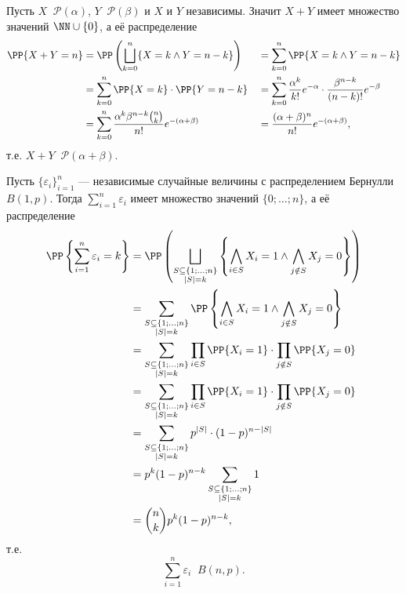 \documentclass[12pt,a4paper]{article}
\newcommand{\Deq}{\mathop{\stackrel{\mathcal{D}}{=}}}
\begin{document}
    \begin{example}
        Пусть $X \Deq \mathcal{P}(\alpha)$, $Y \Deq \mathcal{P}(\beta)$ и $X$ и $Y$ независимы. Значит $X + Y$ имеет множество значений $\NN \cup \{0\}$, а её распределение
        \begin{align*}
            \PP\{X + Y = n\}
            &= \PP\left(\bigsqcup_{k=0}^n \{X = k \wedge Y = n-k\}\right)&
            &= \sum_{k=0}^n \PP\{X = k \wedge Y = n-k\}\\
            &= \sum_{k=0}^n \PP\{X = k\} \cdot \PP\{Y = n-k\}&
            &= \sum_{k=0}^n \frac{\alpha^k}{k!} e^{-\alpha} \cdot \frac{\beta^{n-k}}{(n-k)!} e^{-\beta}\\
            &= \sum_{k=0}^n \frac{\alpha^k \beta^{n-k} \binom{n}{k}}{n!} e^{-(\alpha + \beta)}&
            &= \frac{(\alpha + \beta)^n}{n!} e^{-(\alpha + \beta)},
        \end{align*}
        т.е. $X + Y \Deq \mathcal{P}(\alpha + \beta)$.
    \end{example}

    \begin{example}
        Пусть $\{\varepsilon_i\}_{i=1}^n$ --- независимые случайные величины с распределением Бернулли $B(1, p)$. Тогда $\sum_{i=1}^n \varepsilon_i$ имеет множество значений $\{0; \dots; n\}$, а её распределение
        \begin{align*}
            \PP\left\{\sum_{i=1}^n \varepsilon_i = k\right\}
            &= \PP\left(\bigsqcup_{\substack{S \subseteq \{1; \dots; n\}\\ |S| = k}} \left\{\bigwedge_{i \in S} X_i = 1 \wedge \bigwedge_{j \notin S} X_j = 0\right\}\right)\\
            &= \sum_{\substack{S \subseteq \{1; \dots; n\}\\ |S| = k}} \PP\left\{\bigwedge_{i \in S} X_i = 1 \wedge \bigwedge_{j \notin S} X_j = 0\right\}\\
            &= \sum_{\substack{S \subseteq \{1; \dots; n\}\\ |S| = k}} \prod_{i \in S} \PP\{X_i = 1\} \cdot \prod_{j \notin S} \PP\{X_j = 0\}\\
            &= \sum_{\substack{S \subseteq \{1; \dots; n\}\\ |S| = k}} \prod_{i \in S} \PP\{X_i = 1\} \cdot \prod_{j \notin S} \PP\{X_j = 0\}\\
            &= \sum_{\substack{S \subseteq \{1; \dots; n\}\\ |S| = k}} p^{|S|} \cdot (1-p)^{n-|S|}\\
            &= p^k (1-p)^{n-k} \sum_{\substack{S \subseteq \{1; \dots; n\}\\ |S| = k}} 1\\
            &= \binom{n}{k} p^k (1-p)^{n-k},
        \end{align*}
        т.е.
        \[\sum_{i=1}^n \varepsilon_i \Deq B(n, p).\]
    \end{example}
\end{document}
